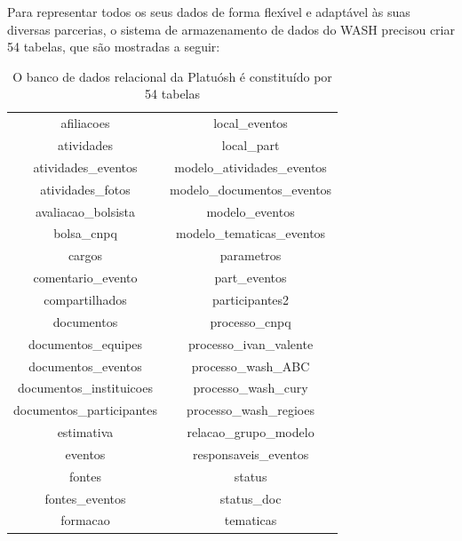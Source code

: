 \documentclass[
12pt,		%
openright,	%
twoside,  %
a4paper,			%
chapter=TITLE,		%
english,			%
french,				%
spanish,			%
brazil				%
]{USPSC-classe/USPSC}
\begin{document}
Para representar todos os seus dados de forma flex\'{\i}vel e adapt\'avel \`as suas diversas parcerias, o sistema de armazenamento de dados do WASH precisou criar 54 tabelas, que s\~ao mostradas a seguir:














\begin{table}[htb]
\tiny
\caption{\label{5b2e4ba8f3836249e7dd88b37344da7bfa3669c5}O banco de dados relacional da Platu\'osh \'e constitu\'{i}do por 54 tabelas}

\centering
\begin{tabular}{|c|c|}
\hline
afiliacoes                     &   local\_eventos \\
 atividades                     &   local\_part \\
 atividades\_eventos             &   modelo\_atividades\_eventos \\
 atividades\_fotos               &   modelo\_documentos\_eventos \\
 avaliacao\_bolsista             &   modelo\_eventos \\
 bolsa\_cnpq                     &   modelo\_tematicas\_eventos \\
 cargos                         &   parametros \\
 comentario\_evento              &   part\_eventos \\
 compartilhados                 &   participantes2 \\
 documentos                     &   processo\_cnpq \\
 documentos\_equipes             &   processo\_ivan\_valente \\
 documentos\_eventos             &   processo\_wash\_ABC \\
 documentos\_instituicoes        &   processo\_wash\_cury \\
 documentos\_participantes       &   processo\_wash\_regioes \\
 estimativa                     &   relacao\_grupo\_modelo \\
 eventos                        &   responsaveis\_eventos \\
 fontes                         &   status \\
 fontes\_eventos                 &   status\_doc \\
 formacao                       &   tematicas \\

\end{tabular}
\end{table}
\end{document}
